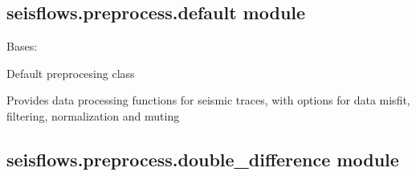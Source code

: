 \documentclass[letterpaper,10pt,english]{sphinxmanual}
\begin{document}
\subsection{seisflows.preprocess.default module}
\label{\detokenize{ref/seisflows.preprocess:module-seisflows.preprocess.default}}\label{\detokenize{ref/seisflows.preprocess:seisflows-preprocess-default-module}}

\begin{fulllineitems}
\label{\detokenize{ref/seisflows.preprocess:seisflows.preprocess.default.default}}
Bases: {\hyperref[\detokenize{ref/seisflows.preprocess:seisflows.preprocess.base.base}]{}}

Default preprocesing class

Provides data processing functions for seismic traces, with options for
data misfit, filtering, normalization and muting

\end{fulllineitems}



\subsection{seisflows.preprocess.double\_difference module}
\label{\detokenize{ref/seisflows.preprocess:module-seisflows.preprocess.double_difference}}\label{\detokenize{ref/seisflows.preprocess:seisflows-preprocess-double-difference-module}}
\end{document}
